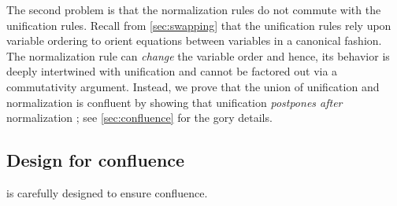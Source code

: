 \documentclass[acmsmall]{acmart}
\newcommand{\ie}{\emph{i.e.}\xspace}	%
\newcommand{\simon}[1]{{\color{dkblue} [{SLPJ}: #1]}}
\newcommand{\lennart}[1]{{\color{dkcyan} [{LA}: #1]}}
\newcommand{\simon}[1]{}
\newcommand{\lennart}[1]{}
\begin{document}
%
The second problem is that the normalization rules do not commute with the unification rules.
%
Recall from \cref{sec:swapping} that the unification rules rely upon
variable ordering to orient equations between variables in a canonical fashion.
%
The normalization rule  can \emph{change}
the variable order and hence, its behavior is deeply intertwined
with unification and cannot be factored out via a commutativity argument.
%
Instead, we prove that the union of unification and normalization
is confluent by showing that unification \emph{postpones after}
normalization \cite{Hindley}; see \cref{sec:confluence} for the gory details.
%

\subsection{Design for confluence} \label{sec:design-confluence}  \label{sec:unifying-lambda}

\versecalc{} is carefully designed to ensure confluence.



%
\end{document}
